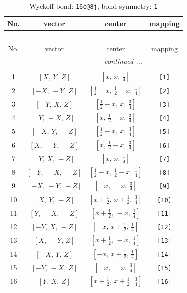 \documentclass[fleqn,8pt]{jsarticle}
\begin{document}
\begin{longtable}{cccc}
\caption{Wyckoff bond: {\tt 16c@8j}, bond symmetry: {\tt 1}}
 \\
 \hline \hline
No. & vector & center & mapping \\ \hline \endfirsthead

\multicolumn{3}{l}{\tablename\ \thetable{}} \\
 \hline \hline
No. & vector & center & mapping \\ \hline \endhead

 \hline \hline
\multicolumn{3}{r}{\footnotesize\it continued ...} \\ \endfoot

 \hline \hline
\multicolumn{3}{r}{} \\ \endlastfoot

1 & $\left[ X,\, Y,\, Z \right]$ & $\left[ x,\, x,\, \frac{1}{4} \right]$ & {\tt [1]} \\ \hline
2 & $\left[ - X,\, - Y,\, Z \right]$ & $\left[ \frac{1}{2} - x,\, \frac{1}{2} - x,\, \frac{1}{4} \right]$ & {\tt [2]} \\ \hline
3 & $\left[ - Y,\, X,\, Z \right]$ & $\left[ \frac{1}{2} - x,\, x,\, \frac{3}{4} \right]$ & {\tt [3]} \\ \hline
4 & $\left[ Y,\, - X,\, Z \right]$ & $\left[ x,\, \frac{1}{2} - x,\, \frac{3}{4} \right]$ & {\tt [4]} \\ \hline
5 & $\left[ - X,\, Y,\, - Z \right]$ & $\left[ \frac{1}{2} - x,\, x,\, \frac{3}{4} \right]$ & {\tt [5]} \\ \hline
6 & $\left[ X,\, - Y,\, - Z \right]$ & $\left[ x,\, \frac{1}{2} - x,\, \frac{3}{4} \right]$ & {\tt [6]} \\ \hline
7 & $\left[ Y,\, X,\, - Z \right]$ & $\left[ x,\, x,\, \frac{1}{4} \right]$ & {\tt [7]} \\ \hline
8 & $\left[ - Y,\, - X,\, - Z \right]$ & $\left[ \frac{1}{2} - x,\, \frac{1}{2} - x,\, \frac{1}{4} \right]$ & {\tt [8]} \\ \hline
9 & $\left[ - X,\, - Y,\, - Z \right]$ & $\left[ - x,\, - x,\, \frac{3}{4} \right]$ & {\tt [9]} \\ \hline
10 & $\left[ X,\, Y,\, - Z \right]$ & $\left[ x + \frac{1}{2},\, x + \frac{1}{2},\, \frac{3}{4} \right]$ & {\tt [10]} \\ \hline
11 & $\left[ Y,\, - X,\, - Z \right]$ & $\left[ x + \frac{1}{2},\, - x,\, \frac{1}{4} \right]$ & {\tt [11]} \\ \hline
12 & $\left[ - Y,\, X,\, - Z \right]$ & $\left[ - x,\, x + \frac{1}{2},\, \frac{1}{4} \right]$ & {\tt [12]} \\ \hline
13 & $\left[ X,\, - Y,\, Z \right]$ & $\left[ x + \frac{1}{2},\, - x,\, \frac{1}{4} \right]$ & {\tt [13]} \\ \hline
14 & $\left[ - X,\, Y,\, Z \right]$ & $\left[ - x,\, x + \frac{1}{2},\, \frac{1}{4} \right]$ & {\tt [14]} \\ \hline
15 & $\left[ - Y,\, - X,\, Z \right]$ & $\left[ - x,\, - x,\, \frac{3}{4} \right]$ & {\tt [15]} \\ \hline
16 & $\left[ Y,\, X,\, Z \right]$ & $\left[ x + \frac{1}{2},\, x + \frac{1}{2},\, \frac{3}{4} \right]$ & {\tt [16]} \\
\end{longtable}
\end{document}
